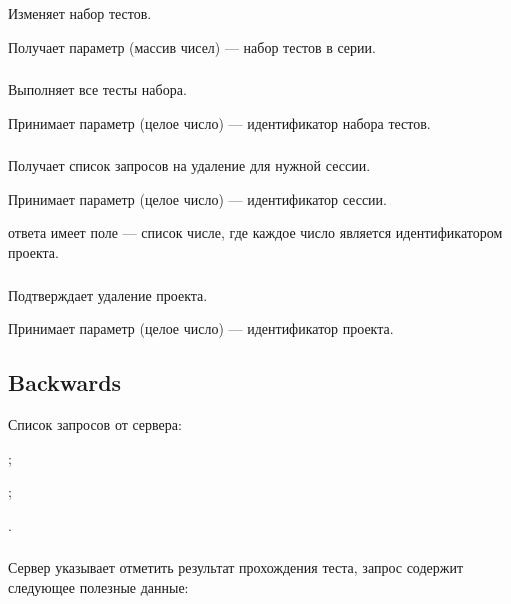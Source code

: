 Изменяет набор тестов.

Получает параметр  (массив чисел) — набор тестов в серии.

\subsubsection{}

Выполняет все тесты набора.

Принимает параметр  (целое число) — идентификатор набора тестов.

\subsubsection{}

Получает список запросов на удаление для нужной сессии.

Принимает параметр  (целое число) — идентификатор сессии.

 ответа имеет поле  — список числе, где каждое число является идентификатором проекта.

\subsubsection{}

Подтверждает удаление проекта.

Принимает параметр  (целое число) — идентификатор проекта.

\subsection{Backwards}

Список запросов от сервера:

\begin{icItems}
	\item {};
	\item {};
	\item {}.
\end{icItems}

\subsubsection{}

Сервер указывает отметить результат прохождения теста, запрос содержит следующее полезные данные:

